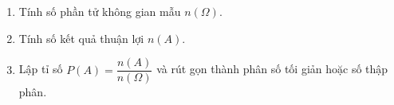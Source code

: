 \begin{enumerate}
\item Tính số phần tử không gian mẫu $n(\Omega)$.
\item Tính số kết quả thuận lợi $n(A)$.
\item Lập tỉ số $P(A) = \dfrac{n(A)}{n(\Omega)}$ và rút gọn thành phân số tối giản hoặc số thập phân.
\end{enumerate}
